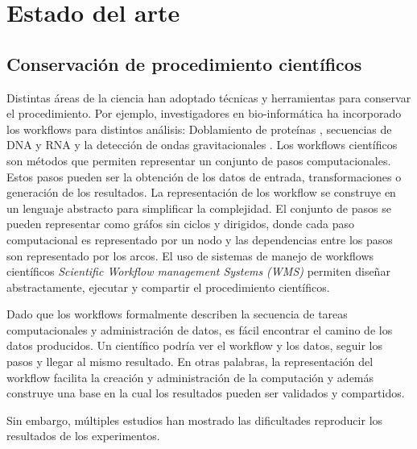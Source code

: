 \chapter{Estado del arte}\label{Chapter2} 
\section{Conservación de procedimiento científicos}

Distintas áreas de la ciencia han adoptado técnicas y herramientas para conservar el procedimiento. Por ejemplo, investigadores en bio-informática ha incorporado los workflows para distintos análisis: 
Doblamiento de proteínas \cite{craddock2006science}, secuencias de DNA y RNA \cite{blankenberg2010galaxy,giardine2005galaxy} y la detección de ondas gravitacionales \cite{deelman2004pegasus}.
Los workflows científicos son métodos que permiten representar un conjunto de pasos computacionales. Estos pasos pueden ser la obtención de los datos de entrada, transformaciones o generación de los resultados.
La representación de los workflow se construye en un lenguaje abstracto para simplificar la complejidad. El conjunto de pasos se pueden representar como gráfos sin ciclos y dirigidos, donde cada paso computacional es representado por un nodo y las dependencias entre los pasos son representado por los arcos.
El uso de sistemas de manejo de workflows científicos \textit{Scientific Workflow management Systems (WMS)} permiten diseñar abstractamente, ejecutar y compartir el procedimiento científicos. 

Dado que los workflows formalmente describen la secuencia de tareas computacionales y administración de datos, es fácil encontrar el camino de los datos producidos.
Un científico podría ver el workflow y los datos, seguir los pasos y llegar al mismo resultado. En otras palabras, la representación del workflow facilita la creación y administración de la computación y además construye una base en la cual los resultados pueden ser validados y compartidos.

Sin embargo, múltiples estudios han mostrado las dificultades reproducir los resultados de los experimentos.




